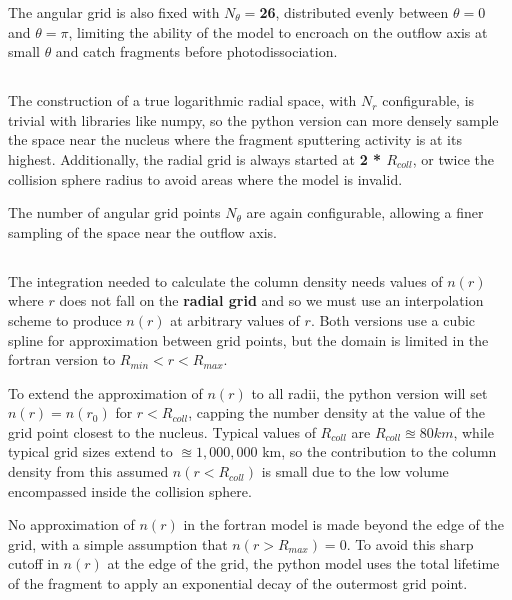 \documentclass[11pt]{article}
\newcommand{\modelterm}[1]{\textcolor{myred}{\textbf{#1}}}
\newcommand{\magicnumber}[1]{\textcolor{myred}{\textbf{#1}}}
\newcommand{\problempart}[1]{\subsection*{\contour{mybblack}{\textcolor{myblack}{#1}}}}
\begin{document}
The angular grid is also fixed with \(N_{\theta} = \)\magicnumber{26}, distributed evenly between \(\theta = 0\) and \(\theta = \pi\), limiting the ability of the model to encroach on the outflow axis at small \(\theta\) and catch fragments before photodissociation.

\problempart{Spatial Gridding: Python}
The construction of a true logarithmic radial space, with \(N_r\) configurable, is trivial with libraries like numpy, so the python version can more densely sample the space near the nucleus where the fragment sputtering activity is at its highest.
Additionally, the radial grid is always started at \magicnumber{2 * \(R_{coll}\)}, or twice the collision sphere radius to avoid areas where the model is invalid.

The number of angular grid points \(N_{\theta}\) are again configurable, allowing a finer sampling of the space near the outflow axis.

\problempart{Column Density Calculation}
The integration needed to calculate the column density needs values of \(n(r)\) where \(r\) does not fall on the \modelterm{radial grid} and so we must use an interpolation scheme to produce \(n(r)\) at arbitrary values of \(r\).
Both versions use a cubic spline for approximation between grid points, but the domain is limited in the fortran version to \(R_{min} < r < R_{max}\).

To extend the approximation of \(n(r)\) to all radii, the python version will set \(n(r) = n(r_0)\) for \(r < R_{coll}\), capping the number density at the value of the grid point closest to the nucleus.
Typical values of \(R_{coll}\) are \(R_{coll} \approxeq 80 km\), while typical grid sizes extend to \(\approxeq 1,000,000\) km, so the contribution to the column density from this assumed \(n(r < R_{coll})\) is small due to the low volume encompassed inside the collision sphere.

No approximation of \(n(r)\) in the fortran model is made beyond the edge of the grid, with a simple assumption that \(n(r > R_{max}) = 0\).
To avoid this sharp cutoff in \(n(r)\) at the edge of the grid, the python model uses the total lifetime of the fragment to apply an exponential decay of the outermost grid point.
\end{document}
